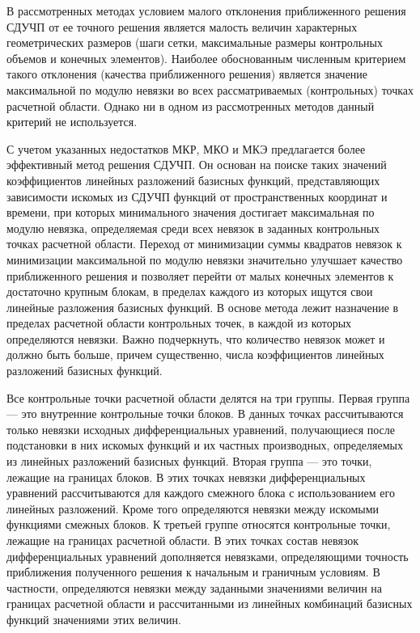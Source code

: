 \documentclass[a4paper,11pt,numreferences,mathsec,kaplist]{isuepsutf8}
\begin{document}
\begin{article}
В рассмотренных методах условием малого отклонения приближенного решения
СДУЧП от ее точного решения является малость величин характерных
геометрических размеров (шаги сетки, максимальные размеры контрольных
объемов и конечных элементов). Наиболее обоснованным численным критерием
такого отклонения (качества приближенного решения) является значение
максимальной по модулю невязки во всех рассматриваемых (контрольных) точках
расчетной области. Однако ни в одном из рассмотренных методов данный
критерий не используется. 

С учетом указанных недостатков МКР, МКО и МКЭ предлагается более
эффективный метод решения СДУЧП. Он основан на поиске таких значений
коэффициентов линейных разложений базисных функций, представляющих
зависимости искомых из СДУЧП функций от пространственных координат и
времени, при которых минимального значения достигает максимальная по модулю
невязка, определяемая среди всех невязок в заданных контрольных точках
расчетной области. Переход от минимизации суммы квадратов невязок к
минимизации максимальной по модулю невязки значительно улучшает качество
приближенного решения и позволяет перейти от малых конечных элементов к
достаточно крупным блокам, в пределах каждого из которых ищутся свои
линейные разложения базисных функций. В основе метода лежит назначение в
пределах расчетной области контрольных точек, в каждой из которых
определяются невязки. Важно подчеркнуть, что количество невязок может
и должно быть больше, причем существенно, числа коэффициентов линейных
разложений базисных функций.

Все контрольные точки расчетной области делятся на три группы. Первая
группа — это внутренние контрольные точки блоков. В данных точках
рассчитываются только невязки исходных дифференциальных уравнений,
получающиеся после подстановки в них искомых функций и их частных
производных, определяемых из линейных разложений базисных функций. Вторая
группа — это точки, лежащие на границах блоков. В этих точках невязки
дифференциальных уравнений рассчитываются для каждого смежного блока с
использованием его линейных разложений. Кроме того определяются невязки
между искомыми функциями смежных блоков. К третьей группе относятся
контрольные точки, лежащие на границах расчетной области. В этих точках
состав невязок дифференциальных уравнений дополняется невязками,
определяющими точность приближения полученного решения к начальным и
граничным условиям. В частности, определяются невязки между заданными
значениями величин на границах расчетной области и рассчитанными из
линейных комбинаций базисных функций значениями этих величин.


\end{article}
\end{document}

